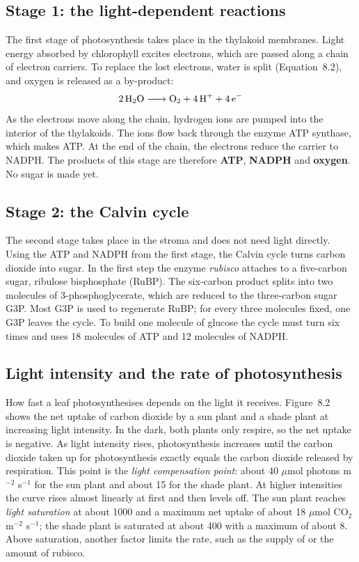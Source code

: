 \documentclass[11pt,a4paper]{article}
\begin{document}
\subsection{Stage 1: the light-dependent reactions}
The first stage of photosynthesis takes place in the thylakoid membranes. Light energy absorbed by chlorophyll
excites electrons, which are passed along a chain of electron carriers. To replace the lost electrons, water is
split (Equation~8.2), and oxygen is released as a by-product:
\begin{equation}
  \ce{2 H2O -> O2 + 4 H+ + 4 e-}
\end{equation}
As the electrons move along the chain, hydrogen ions are pumped into the interior of the thylakoids. The ions flow back
through the enzyme ATP synthase, which makes ATP. At the end of the chain, the electrons reduce the carrier 
to NADPH. The products of this stage are therefore \textbf{ATP}, \textbf{NADPH} and \textbf{oxygen}. No sugar is made yet.

\subsection{Stage 2: the Calvin cycle}
The second stage takes place in the stroma and does not need light directly. Using the ATP and NADPH from the first
stage, the Calvin cycle turns carbon dioxide into sugar. In the first step the enzyme \emph{rubisco} attaches
 to a five-carbon sugar, ribulose bisphosphate (RuBP). The six-carbon product splits into two molecules of
3-phosphoglycerate, which are reduced to the three-carbon sugar G3P. Most G3P is used to regenerate RuBP; for every
three  molecules fixed, one G3P leaves the cycle. To build one molecule of glucose the cycle must turn
six times and uses 18 molecules of ATP and 12 molecules of NADPH.

\subsection{Light intensity and the rate of photosynthesis}
How fast a leaf photosynthesises depends on the light it receives. Figure~8.2 shows the net uptake of carbon dioxide
by a sun plant and a shade plant at increasing light intensity. In the dark, both plants only respire, so the net
uptake is negative. As light intensity rises, photosynthesis increases until the carbon dioxide taken up for
photosynthesis exactly equals the carbon dioxide released by respiration. This point is the \emph{light compensation
point}: about 40 $\mu$mol photons m$^{-2}$ s$^{-1}$ for the sun plant and about 15 for the shade plant. At higher
intensities the curve rises almost linearly at first and then levels off. The sun plant reaches \emph{light
saturation} at about 1000 and a maximum net uptake of about 18 $\mu$mol CO$_2$ m$^{-2}$ s$^{-1}$; the shade plant is
saturated at about 400 with a maximum of about 8. Above saturation, another factor limits the rate, such as the
supply of  or the amount of rubisco.
\end{document}
